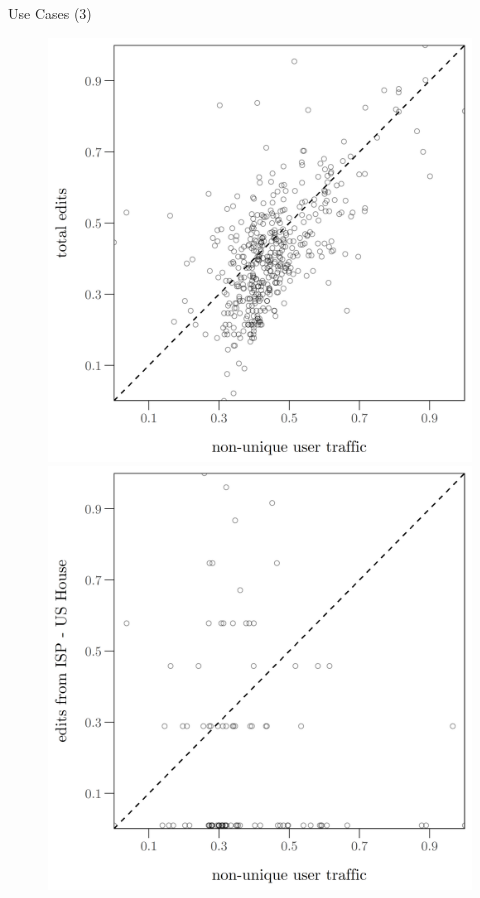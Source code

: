 \begin{frame}{Use Cases (3)}
\begin{figure}[t]
\begin{center}
\vspace{-.1cm}
\hspace*{-0.7cm}
	\includegraphics[scale=.5]{uc_3_usah_et.png}
\hspace*{0.5cm}
	\includegraphics[scale=.5]{uc_3_usah_et2.png}
	\vspace{-.5cm}
\end{center}
\end{figure}
\end{frame}

